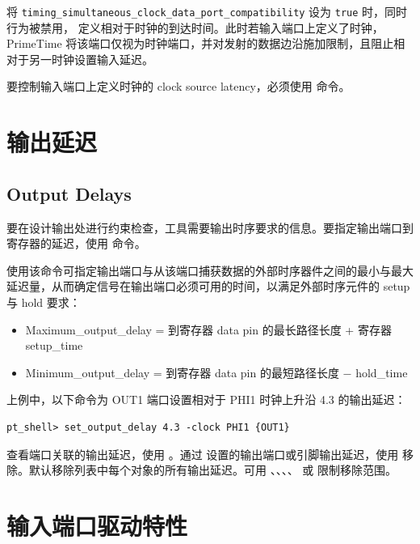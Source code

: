 将 \texttt{timing\_simultaneous\_clock\_data\_port\_compatibility} 设为 \texttt{true} 时，同时行为被禁用， 定义相对于时钟的到达时间。此时若输入端口上定义了时钟，PrimeTime 将该端口仅视为时钟端口，并对发射的数据边沿施加限制，且阻止相对于另一时钟设置输入延迟。

要控制输入端口上定义时钟的 clock source latency，必须使用  命令。

\section{输出延迟}
\subsection*{Output Delays}

要在设计输出处进行约束检查，工具需要输出时序要求的信息。要指定输出端口到寄存器的延迟，使用  命令。

使用该命令可指定输出端口与从该端口捕获数据的外部时序器件之间的最小与最大延迟量，从而确定信号在输出端口必须可用的时间，以满足外部时序元件的 setup 与 hold 要求：
\begin{itemize}
  \item Maximum\_output\_delay = 到寄存器 data pin 的最长路径长度 + 寄存器 setup\_time
  \item Minimum\_output\_delay = 到寄存器 data pin 的最短路径长度 $-$ hold\_time
\end{itemize}


上例中，以下命令为 OUT1 端口设置相对于 PHI1 时钟上升沿 4.3 的输出延迟：
\begin{lstlisting}
pt_shell> set_output_delay 4.3 -clock PHI1 {OUT1}
\end{lstlisting}

查看端口关联的输出延迟，使用 。通过  设置的输出端口或引脚输出延迟，使用  移除。默认移除列表中每个对象的所有输出延迟。可用 、、、、 或  限制移除范围。


\section{输入端口驱动特性}
